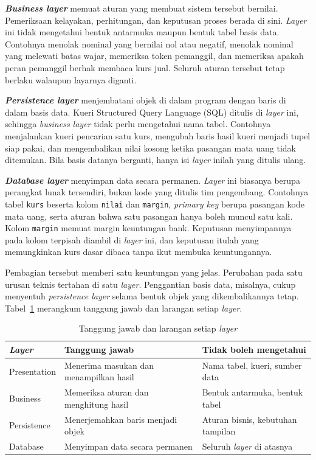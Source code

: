 \textbf{\textit{Business layer}} memuat aturan yang membuat sistem tersebut bernilai.
Pemeriksaan kelayakan, perhitungan, dan keputusan proses berada di sini.
\textit{Layer} ini tidak mengetahui bentuk antarmuka maupun bentuk tabel basis data.
Contohnya menolak nominal yang bernilai nol atau negatif, menolak nominal yang
melewati batas wajar, memeriksa token pemanggil, dan memeriksa apakah peran
pemanggil berhak membaca kurs jual. Seluruh aturan tersebut tetap berlaku
walaupun layarnya diganti.

\textbf{\textit{Persistence layer}} menjembatani objek di dalam program dengan baris di
dalam basis data. Kueri Structured Query Language (SQL) ditulis di \textit{layer} ini,
sehingga \textit{business layer} tidak perlu mengetahui nama tabel. Contohnya menjalankan
kueri pencarian satu kurs, mengubah baris hasil kueri menjadi tupel siap pakai,
dan mengembalikan nilai kosong ketika pasangan mata uang tidak ditemukan. Bila
basis datanya berganti, hanya isi \textit{layer} inilah yang ditulis ulang.

\textbf{\textit{Database layer}} menyimpan data secara permanen. \textit{Layer} ini biasanya
berupa perangkat lunak tersendiri, bukan kode yang ditulis tim pengembang.
Contohnya tabel \texttt{kurs} beserta kolom \texttt{nilai} dan
\texttt{margin}, \textit{primary key} berupa pasangan kode mata uang, serta aturan bahwa
satu pasangan hanya boleh muncul satu kali. Kolom \texttt{margin} memuat margin
keuntungan bank. Keputusan menyimpannya pada kolom terpisah diambil di \textit{layer}
ini, dan keputusan itulah yang memungkinkan kurs dasar dibaca tanpa ikut
membuka keuntungannya.

Pembagian tersebut memberi satu keuntungan yang jelas. Perubahan pada satu
urusan teknis tertahan di satu \textit{layer}. Penggantian basis data, misalnya, cukup
menyentuh \textit{persistence layer} selama bentuk objek yang dikembalikannya tetap.
Tabel~\ref{tab:tanggung-jawab} merangkum tanggung jawab dan larangan setiap
\textit{layer}.

\begin{table}[htbp]
  \centering
  \caption{Tanggung jawab dan larangan setiap \textit{layer}}
  \label{tab:tanggung-jawab}
  \begin{tabularx}{\textwidth}{|l|X|X|}
    \hline
    \textbf{\textit{Layer}} & \textbf{Tanggung jawab} & \textbf{Tidak boleh mengetahui} \\
    \hline
    Presentation & Menerima masukan dan menampilkan hasil & Nama tabel, kueri, sumber data \\
    \hline
    Business & Memeriksa aturan dan menghitung hasil & Bentuk antarmuka, bentuk tabel \\
    \hline
    Persistence & Menerjemahkan baris menjadi objek & Aturan bisnis, kebutuhan tampilan \\
    \hline
    Database & Menyimpan data secara permanen & Seluruh \textit{layer} di atasnya \\
    \hline
  \end{tabularx}
\end{table}

